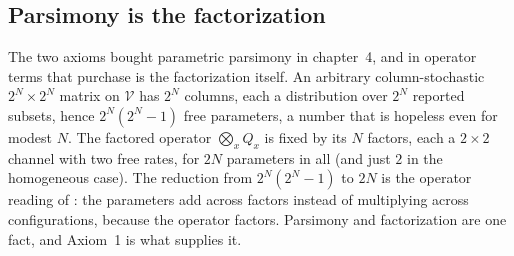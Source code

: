 \subsection*{Parsimony is the factorization}

The two axioms bought parametric parsimony in chapter~4, and in operator terms
that purchase is the factorization itself. An arbitrary column-stochastic
$2^{N} \times 2^{N}$ matrix on $\mathcal{V}$ has $2^N$ columns, each a
distribution over $2^N$ reported subsets, hence $2^N (2^N - 1)$ free parameters,
a number that is hopeless even for modest $N$. The factored operator
$\bigotimes_x Q_x$ is fixed by its $N$ factors, each a $2 \times 2$ channel with
two free rates, for $2N$ parameters in all (and just $2$ in the homogeneous
case). The reduction from $2^N (2^N - 1)$ to $2N$ is the operator reading of
: the parameters add across factors instead of
multiplying across configurations, because the operator factors. Parsimony and
factorization are one fact, and Axiom~1 is what supplies it.
